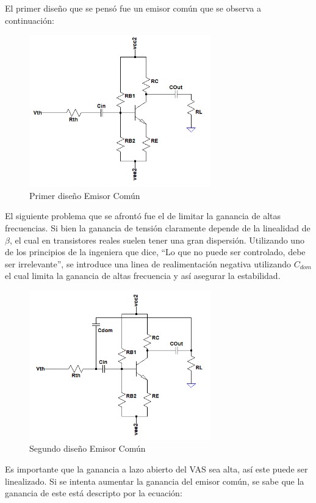 El primer diseño que se pensó fue un emisor común que se observa a continuación:
\begin{figure}[H]
\centering
	\includegraphics[width=0.7\textwidth]{ImagenesGain-Stage/ec1.png}
	\caption{Primer diseño Emisor Común}
	\label{fig:ec1}
\end{figure}
El siguiente problema que se afrontó fue el de limitar la ganancia de altas frecuencias.
Si bien la ganancia de tensión claramente depende de la linealidad de $\beta$, el cual en transistores reales suelen tener una gran dispersión. Utilizando uno de los principios de la ingeniera que dice,
 ``Lo que no puede ser controlado, debe ser irrelevante'', se introduce una linea de realimentación negativa utilizando $C_{dom}$ el cual limita la ganancia de altas frecuencia y así asegurar la estabilidad.
 \begin{figure}[H]
\centering
	\includegraphics[width=0.7\textwidth]{ImagenesGain-Stage/ec2.png}
	\caption{Segundo diseño Emisor Común}
	\label{fig:ec2}
\end{figure}
Es importante que la ganancia a lazo abierto del VAS sea alta, así este puede ser linealizado. Si se intenta aumentar la ganancia del emisor común, se sabe que la ganancia de este está descripto por la ecuación:
